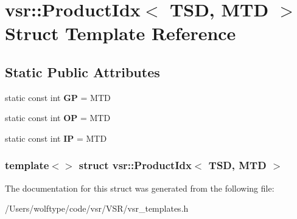 \hypertarget{structvsr_1_1_product_idx_3_01_t_s_d_00_01_m_t_d_01_4}{\section{vsr\-:\-:Product\-Idx$<$ T\-S\-D, M\-T\-D $>$ Struct Template Reference}
\label{structvsr_1_1_product_idx_3_01_t_s_d_00_01_m_t_d_01_4}
}
\subsection*{Static Public Attributes}
\begin{DoxyCompactItemize}
\item 
\hypertarget{structvsr_1_1_product_idx_3_01_t_s_d_00_01_m_t_d_01_4_a77cd1241dcb36f75142861703527c1e0}{static const int {\bfseries G\-P} = M\-T\-D}\label{structvsr_1_1_product_idx_3_01_t_s_d_00_01_m_t_d_01_4_a77cd1241dcb36f75142861703527c1e0}

\item 
\hypertarget{structvsr_1_1_product_idx_3_01_t_s_d_00_01_m_t_d_01_4_a6fc4673f420447a15d5375af06e9bf40}{static const int {\bfseries O\-P} = M\-T\-D}\label{structvsr_1_1_product_idx_3_01_t_s_d_00_01_m_t_d_01_4_a6fc4673f420447a15d5375af06e9bf40}

\item 
\hypertarget{structvsr_1_1_product_idx_3_01_t_s_d_00_01_m_t_d_01_4_a66b63f4a6b05ed350931da8a2d707e40}{static const int {\bfseries I\-P} = M\-T\-D}\label{structvsr_1_1_product_idx_3_01_t_s_d_00_01_m_t_d_01_4_a66b63f4a6b05ed350931da8a2d707e40}

\end{DoxyCompactItemize}
\subsubsection*{template$<$$>$ struct vsr\-::\-Product\-Idx$<$ T\-S\-D, M\-T\-D $>$}



The documentation for this struct was generated from the following file\-:\begin{DoxyCompactItemize}
\item 
/\-Users/wolftype/code/vsr/\-V\-S\-R/vsr\-\_\-templates.\-h\end{DoxyCompactItemize}
